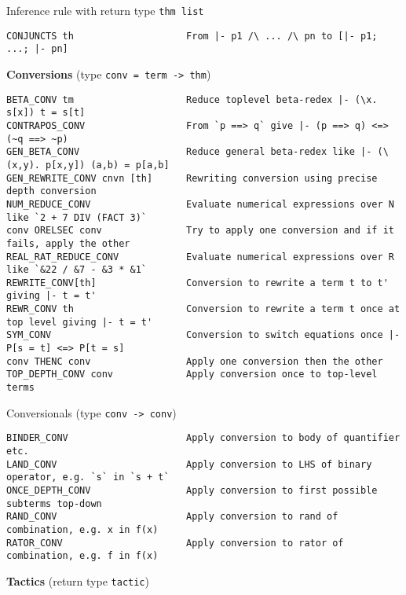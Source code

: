 \documentclass{llncs}
\begin{document}
Inference rule with return type \verb^thm list^

\begingroup
\scriptsize
\begin{verbatim}
CONJUNCTS th                    From |- p1 /\ ... /\ pn to [|- p1; ...; |- pn]
\end{verbatim}
\endgroup

\bigskip

\textbf{Conversions} (type \verb^conv = term -> thm^)

\begingroup
\scriptsize
\begin{verbatim}
BETA_CONV tm                    Reduce toplevel beta-redex |- (\x. s[x]) t = s[t]
CONTRAPOS_CONV                  From `p ==> q` give |- (p ==> q) <=> (~q ==> ~p)
GEN_BETA_CONV                   Reduce general beta-redex like |- (\(x,y). p[x,y]) (a,b) = p[a,b]
GEN_REWRITE_CONV cnvn [th]      Rewriting conversion using precise depth conversion
NUM_REDUCE_CONV                 Evaluate numerical expressions over N like `2 + 7 DIV (FACT 3)`
conv ORELSEC conv               Try to apply one conversion and if it fails, apply the other
REAL_RAT_REDUCE_CONV            Evaluate numerical expressions over R like `&22 / &7 - &3 * &1`
REWRITE_CONV[th]                Conversion to rewrite a term t to t' giving |- t = t'
REWR_CONV th                    Conversion to rewrite a term t once at top level giving |- t = t'
SYM_CONV                        Conversion to switch equations once |- P[s = t] <=> P[t = s]
conv THENC conv                 Apply one conversion then the other
TOP_DEPTH_CONV conv             Apply conversion once to top-level terms
\end{verbatim}
\endgroup

{Conversionals} (type \verb^conv -> conv^)

\begingroup
\scriptsize
\begin{verbatim}
BINDER_CONV                     Apply conversion to body of quantifier etc.
LAND_CONV                       Apply conversion to LHS of binary operator, e.g. `s` in `s + t`
ONCE_DEPTH_CONV                 Apply conversion to first possible subterms top-down
RAND_CONV                       Apply conversion to rand of combination, e.g. x in f(x)
RATOR_CONV                      Apply conversion to rator of combination, e.g. f in f(x)
\end{verbatim}
\endgroup

\newpage

\textbf{Tactics} (return type \verb^tactic^)
\end{document}
